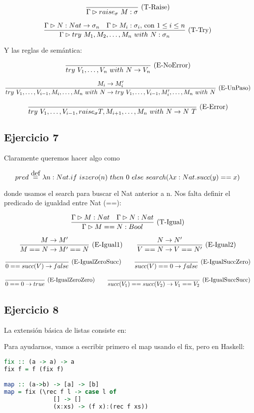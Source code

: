 \[\deriv{}{\Gtipa{raise_\sigma\ M}{\sigma}}{T-Raise}\]

\[\frac{\Gamma \rhd N : Nat \to \sigma_n\quad \Gamma \rhd M_i : \sigma_i\text{, con $1 \leq i \leq n$}}{\Gamma \rhd try\ M_1, M_2, \dots, M_n\ with\ N : \sigma_n}\ \text{(T-Try)}\]

Y las reglas de semántica:

\[\frac{}{try\ V_1, \dots, V_n\ with\ N \to V_n}\ \text{(E-NoError)}\]

\[\frac{M_i \to M_i'}{try\ V_1, \dots, V_{i-1}, M_i ,\dots, M_n\ with\ N \to try\ V_1, \dots, V_{i-1}, M_i' ,\dots, M_n\ with\ N}\ \text{(E-UnPaso)}\]

\[\deriv{}{try\ V_1, \dots, V_{i-1}, raise_\sigma T , M_{i+1},\dots, M_n\ with\ N \to N\ T}{E-Error}\]

\subsection*{Ejercicio 7}

Claramente queremos hacer algo como

\[pred \eqdef \lambda n : Nat. \ifte{iszero(n)}{0}{search (\lambda x: Nat. succ(y) == x)}\]

donde usamos el search para buscar el Nat anterior a n. Nos falta definir el predicado de igualdad entre Nat (==):

\[\frac{\Gamma \rhd M : Nat\quad \Gamma \rhd N : Nat}{\Gamma \rhd M == N : Bool}\ \text{(T-Igual)}\]

\[\frac{M \to M'}{M == N \to M' == N}\ \text{(E-Igual1)}\quad\quad \frac{N \to N'}{V == N \to V == N'}\ \text{(E-Igual2)}\]

\[\frac{}{0 == succ(V) \to false}\ \text{(E-IgualZeroSucc)}\quad\quad \frac{}{succ(V) == 0 \to false}\ \text{(E-IgualSuccZero)}\]

\[\frac{}{0 == 0 \to true}\ \text{(E-IgualZeroZero)}\quad\quad \frac{}{succ(V_1) == succ(V_2) \to V_1 == V_2}\ \text{(E-IgualSuccSucc)}\]

\subsection*{Ejercicio 8} La extensión básica de listas consiste en:


Para ayudarnos, vamos a escribir primero el map usando el fix, pero en Haskell:

\begin{lstlisting}[language=Haskell]
fix :: (a -> a) -> a
fix f = f (fix f)

map :: (a->b) -> [a] -> [b]
map = fix (\rec f l -> case l of
              [] -> []
              (x:xs) -> (f x):(rec f xs))
\end{lstlisting}

